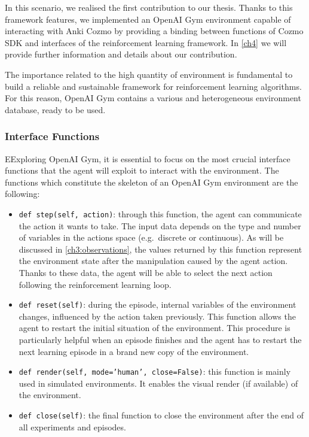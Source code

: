 In this scenario, we realised the first contribution to our thesis. Thanks to this framework features, we implemented an OpenAI Gym environment capable of interacting with Anki Cozmo by providing a binding between functions of Cozmo SDK and interfaces of the reinforcement learning framework. In \vref{ch4} we will provide further information and details about our contribution.

The importance related to the high quantity of environment is fundamental to build a reliable and sustainable framework for reinforcement learning algorithms. For this reason, OpenAI Gym contains a various and heterogeneous environment database, ready to be used.

\subsubsection{Interface Functions}

EExploring OpenAI Gym, it is essential to focus on the most crucial interface functions that the agent will exploit to interact with the environment.
The functions which constitute the skeleton of an OpenAI Gym environment are the following:
\begin{itemize}
    \item \texttt{def step(self, action)}: through this function, the agent can communicate the action it wants to take. The input data depends on the type and number of variables in the actions space (e.g.\ discrete or continuous). As will be discussed in \vref{ch3:observations}, the values returned by this function represent the environment state after the manipulation caused by the agent action. Thanks to these data, the agent will be able to select the next action following the reinforcement learning loop.
    \item \texttt{def reset(self)}: during the episode, internal variables of the environment changes, influenced by the action taken previously. This function allows the agent to restart the initial situation of the environment. This procedure is particularly helpful when an episode finishes and the agent has to restart the next learning episode in a brand new copy of the environment.
    \item \texttt{def render(self, mode='human', close=False)}: this function is mainly used in simulated environments. It enables the visual render (if available) of the environment.
 \item \texttt{def close(self)}: the final function to close the environment after the end of all experiments and episodes.
\end{itemize}

